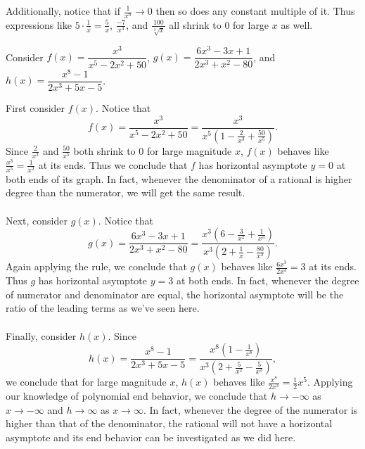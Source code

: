 \documentclass{ximera}
\begin{document}
Additionally, notice that if $\frac{1}{x^n}\rightarrow 0$ then so does any constant multiple of it. Thus expressions like $5\cdot\frac{1}{x}=\frac{5}{x}$, $\frac{-7}{x^3}$, and $\frac{100}{\sqrt[3]{x}}$ all shrink to $0$ for large $x$ as well.

\begin{example}
Consider $f(x)=\dfrac{x^3}{x^5-2x^2+50}$, $g(x)=\dfrac{6x^3-3x+1}{2x^3+x^2-80}$, and $h(x)=\dfrac{x^8-1}{2x^3+5x-5}$.
\begin{explanation} First consider $f(x)$. Notice that 
$$f(x)=\dfrac{x^3}{x^5-2x^2+50}=\dfrac{x^3}{x^5(1-\frac{2}{x^3}+\frac{50}{x^5})}.$$ Since $\frac{2}{x^3}$ and $\frac{50}{x^5}$ both shrink to $0$ for large magnitude $x$, $f(x)$ behaves like $\frac{x^3}{x^5}=\frac{1}{x^2}$ at its ends. Thus we conclude that $f$ has horizontal asymptote $y=0$ at both ends of its graph. In fact, whenever the denominator of a rational is higher degree than the numerator, we will get the same result.
\\
\\Next, consider $g(x)$. Notice that
$$g(x)=\dfrac{6x^3-3x+1}{2x^3+x^2-80}=\dfrac{x^3(6-\frac{3}{x^2}+\frac{1}{x^3})}{x^3(2+\frac{1}{x}-\frac{80}{x^3})}.$$ 
Again applying the rule, we conclude that $g(x)$ behaves like $\frac{6x^3}{2x^3}=3$ at its ends. Thus $g$ has horizontal asymptote $y=3$ at both ends. In fact, whenever the degree of numerator and denominator are equal, the horizontal asymptote will be the ratio of the leading terms as we've seen here.
\\
\\Finally, consider $h(x)$. Since 
$$h(x)=\dfrac{x^8-1}{2x^3+5x-5}=\dfrac{x^8(1-\frac{1}{x^8})}{x^3(2+\frac{5}{x^2}-\frac{5}{x^3})},$$
we conclude that for large magnitude $x$, $h(x)$ behaves like $\frac{x^8}{2x^3}=\frac{1}{2}x^5$. Applying our knowledge of polynomial end behavior, we conclude that $h\rightarrow -\infty$ as $x\rightarrow -\infty$ and $h\rightarrow\infty$ as $x\rightarrow\infty$. In fact, whenever the degree of the numerator is higher than that of the denominator, the rational will not have a horizontal asymptote and its end behavior can be investigated as we did here.
\end{explanation}
\end{example}
\end{document}
